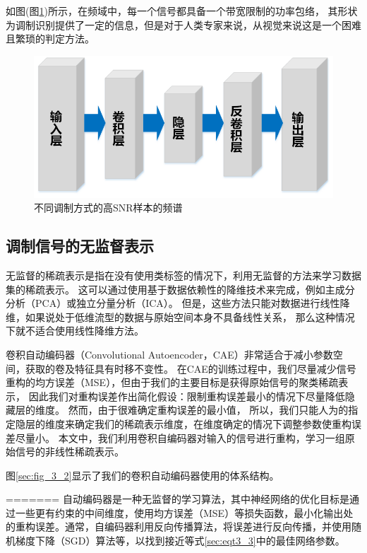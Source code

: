 如图(图\ref{sec:fig_3_3})所示，在频域中，每一个信号都具备一个带宽限制的功率包络，
其形状为调制识别提供了一定的信息，但是对于人类专家来说，从视觉来说这是一个困难且繁琐的判定方法。\par
\begin{figure}[!h]
	\centering
	\includegraphics[scale=1.0]{figures/chapter_3/fig_3_3}
	\caption{不同调制方式的高SNR样本的频谱}\label{sec:fig_3_3}
\end{figure}


\subsection{调制信号的无监督表示}

无监督的稀疏表示是指在没有使用类标签的情况下，利用无监督的方法来学习数据集的稀疏表示。
这可以通过使用基于数据依赖性的降维技术来完成，例如主成分分析（PCA）或独立分量分析（ICA）。
但是，这些方法只能对数据进行线性降维，如果说处于低维流型的数据与原始空间本身不具备线性关系，
那么这种情况下就不适合使用线性降维方法。\par

卷积自动编码器（Convolutional Autoencoder，CAE）非常适合于减小参数空间，获取的卷及特征具有时移不变性。
在CAE的训练过程中，我们尽量减少信号重构的均方误差（MSE），但由于我们的主要目标是获得原始信号的聚类稀疏表示，
因此我们对重构误差作出简化假设：限制重构误差最小的情况下尽量降低隐藏层的维度。
然而，由于很难确定重构误差的最小值，
所以，我们只能人为的指定隐层的维度来确定我们的稀疏表示维度，在维度确定的情况下调整参数使重构误差尽量小。
本文中，我们利用卷积自编码器对输入的信号进行重构，学习一组原始信号的非线性稀疏表示。\par
图\ref{sec:fig_3_2}显示了我们的卷积自动编码器使用的体系结构。\par
=======
自动编码器是一种无监督的学习算法，其中神经网络的优化目标是通过一些更有约束的中间维度，使用均方误差（MSE）等损失函数，最小化输出处的重构误差。通常，自编码器利用反向传播算法，将误差进行反向传播，并使用随机梯度下降（SGD）算法等，以找到接近等式\ref{sec:eqt3_3}中的最佳网络参数。

